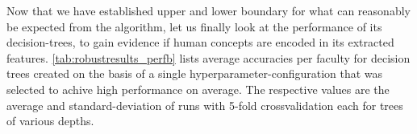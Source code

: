 \begin{figure}[h]
	\begin{center}
	\end{center}
\end{figure}

Now that we have established upper and lower boundary for what can reasonably be expected from the algorithm, let us finally look at the performance of its decision-trees, to gain evidence if human concepts are encoded in its extracted features. \autoref{tab:robustresults_perfb} lists average accuracies per faculty for decision trees created on the basis of a single hyperparameter-configuration that was selected to achive high performance on average. The respective values are the average and standard-deviation of runs with 5-fold crossvalidation each for trees of various depths.

